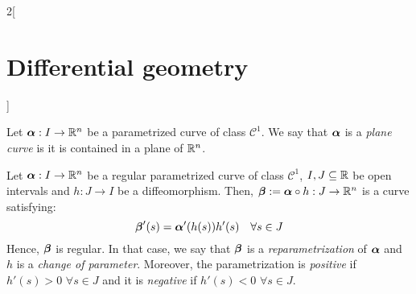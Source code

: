 \documentclass[../../../main.tex]{subfiles}
\begin{document}
\begin{multicols}{2}[\section{Differential geometry}]
  \begin{definition}
    Let $\boldsymbol{\mathrm{\alpha}}:I\rightarrow\mathbb{R}^n$ be a parametrized curve of class $\mathcal{C}^1$. We say that $\boldsymbol{\mathrm{\alpha}}$ is a \emph{plane curve} is it is contained in a plane of $\mathbb{R}^n$.
  \end{definition}
  \begin{definition}\label{DG_reparam}
    Let $\boldsymbol{\mathrm{\alpha}}:I\rightarrow\mathbb{R}^n$ be a regular parametrized curve of class $\mathcal{C}^1$, $I,J\subseteq\mathbb{R}$ be open intervals and $h:J\rightarrow I$ be a diffeomorphism. Then, $\boldsymbol{\mathrm{\beta}}:=\boldsymbol{\mathrm{\alpha}}\circ h:J\rightarrow\mathbb{R}^n$ is a curve satisfying: $$\boldsymbol{\mathrm{\beta}}'(s)=\boldsymbol{\mathrm{\alpha}}'(h(s))h'(s)\quad\forall s\in J$$ Hence, $\boldsymbol{\mathrm{\beta}}$ is regular. In that case, we say that $\boldsymbol{\mathrm{\beta}}$ is a \emph{reparametrization} of $\boldsymbol{\mathrm{\alpha}}$ and $h$ is a \emph{change of parameter}. Moreover, the parametrization is \emph{positive} if $h'(s)>0$ $\forall s\in J$ and it is \emph{negative} if $h'(s)<0$ $\forall s\in J$.
  \end{definition}

\end{multicols}
\end{document}
